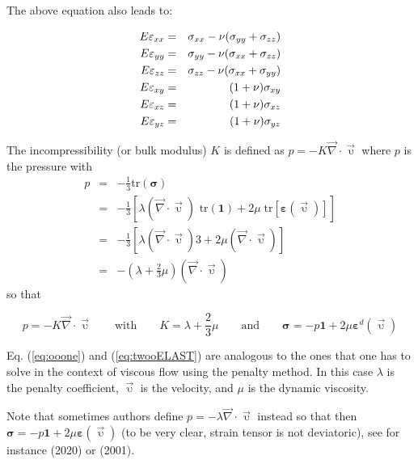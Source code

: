 The above equation also leads to:
\begin{mdframed}[backgroundcolor=blue!5]
\begin{eqnarray}
E \varepsilon_{xx} &=&  \sigma_{xx} - \nu (\sigma_{yy}+\sigma_{zz}) \nonumber\\
E \varepsilon_{yy} &=&  \sigma_{yy} - \nu (\sigma_{xx}+\sigma_{zz}) \nonumber\\
E \varepsilon_{zz} &=&  \sigma_{zz} - \nu (\sigma_{xx}+\sigma_{yy}) \nonumber\\
E \varepsilon_{xy} &=&  (1+\nu) \sigma_{xy} \nonumber\\
E \varepsilon_{xz} &=&  (1+\nu) \sigma_{xz} \nonumber\\
E \varepsilon_{yz} &=&  (1+\nu) \sigma_{yz} \label{eqs:elEe}
\end{eqnarray}
\end{mdframed}

The incompressibility (or bulk modulus) $K$ is defined as $p=-K \vec{\nabla}\cdot\vec{\upupsilon}$ where $p$ is the pressure with 
\begin{eqnarray}
p
&=&-\frac{1}{3} \textrm{tr}({\bm \sigma}) \nonumber\\
&=& -\frac{1}{3} [ \lambda (\vec{\nabla}\cdot\vec{\upupsilon}) 
{\textrm{ tr}}({\bm 1}) 
+ 2 \mu \; \textrm{tr}[{\bm \varepsilon}(\vec{\upupsilon})]] \nonumber\\
 &=& -\frac{1}{3} [ \lambda (\vec{\nabla}\cdot\vec{\upupsilon})  3  + 2 \mu  (\vec{\nabla}\cdot\vec{\upupsilon}) ] \nonumber\\
 &=& -\left( \lambda + \frac{2}{3} \mu \right) (\vec{\nabla}\cdot\vec{\upupsilon})  
\end{eqnarray}
so that 
\begin{mdframed}[backgroundcolor=blue!5]
\[
p=-K \vec{\nabla}\cdot\vec{\upupsilon} 
\qquad
\text{with}
\qquad
K=\lambda+\frac{2}{3}\mu
\qquad
\text{and}
\qquad
{\bm \sigma} = -p {\bm 1} + 2\mu {\bm \varepsilon}^d(\vec\upupsilon)
\]
\end{mdframed}

\begin{remark}
Eq. (\ref{eq:ooone}) and (\ref{eq:twooELAST}) are analogous to the ones that one has to solve in the context of viscous flow using the penalty method. In this case $\lambda$ is the penalty coefficient, $\vec{\upupsilon}$ is the velocity, and $\mu$ is the dynamic viscosity.
\end{remark}

\begin{remark}
Note that sometimes authors define $p=-\lambda  \vec{\nabla}\cdot\vec{\upupsilon}$ instead so that then 
${\bm \sigma} = -p {\bm 1} + 2\mu {\bm \varepsilon}(\vec\upupsilon)$ (to
be very clear, strain tensor is not deviatoric),
see for instance \textcite{samb20} (2020) or \textcite{hala01} (2001).
\end{remark}







